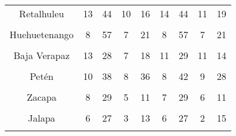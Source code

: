 {\begin{tabular}[t]{ccccccccc}
Retalhuleu & 13 & 44 & 10 & 16 & 14 & 44 & 11 & 19\\
\cellcolor[HTML]{B6B3FF}{San Marcos} & \cellcolor[HTML]{B6B3FF}{3} & \cellcolor[HTML]{B6B3FF}{51} & \cellcolor[HTML]{B6B3FF}{6} & \cellcolor[HTML]{B6B3FF}{18} & \cellcolor[HTML]{B6B3FF}{4} & \cellcolor[HTML]{B6B3FF}{49} & \cellcolor[HTML]{B6B3FF}{3} & \cellcolor[HTML]{B6B3FF}{16}\\
Huehuetenango & 8 & 57 & 7 & 21 & 8 & 57 & 7 & 21\\
\cellcolor[HTML]{B6B3FF}{Quiché} & \cellcolor[HTML]{B6B3FF}{7} & \cellcolor[HTML]{B6B3FF}{44} & \cellcolor[HTML]{B6B3FF}{8} & \cellcolor[HTML]{B6B3FF}{19} & \cellcolor[HTML]{B6B3FF}{6} & \cellcolor[HTML]{B6B3FF}{47} & \cellcolor[HTML]{B6B3FF}{5} & \cellcolor[HTML]{B6B3FF}{21}\\
Baja Verapaz & 13 & 28 & 7 & 18 & 11 & 29 & 11 & 14\\
\cellcolor[HTML]{B6B3FF}{Alta Verapaz} & \cellcolor[HTML]{B6B3FF}{8} & \cellcolor[HTML]{B6B3FF}{39} & \cellcolor[HTML]{B6B3FF}{6} & \cellcolor[HTML]{B6B3FF}{18} & \cellcolor[HTML]{B6B3FF}{8} & \cellcolor[HTML]{B6B3FF}{39} & \cellcolor[HTML]{B6B3FF}{6} & \cellcolor[HTML]{B6B3FF}{18}\\
Petén & 10 & 38 & 8 & 36 & 8 & 42 & 9 & 28\\
\cellcolor[HTML]{B6B3FF}{Izabal} & \cellcolor[HTML]{B6B3FF}{9} & \cellcolor[HTML]{B6B3FF}{24} & \cellcolor[HTML]{B6B3FF}{7} & \cellcolor[HTML]{B6B3FF}{15} & \cellcolor[HTML]{B6B3FF}{11} & \cellcolor[HTML]{B6B3FF}{20} & \cellcolor[HTML]{B6B3FF}{9} & \cellcolor[HTML]{B6B3FF}{13}\\
Zacapa & 8 & 29 & 5 & 11 & 7 & 29 & 6 & 11\\
\cellcolor[HTML]{B6B3FF}{Chiquimula} & \cellcolor[HTML]{B6B3FF}{6} & \cellcolor[HTML]{B6B3FF}{27} & \cellcolor[HTML]{B6B3FF}{10} & \cellcolor[HTML]{B6B3FF}{9} & \cellcolor[HTML]{B6B3FF}{9} & \cellcolor[HTML]{B6B3FF}{28} & \cellcolor[HTML]{B6B3FF}{4} & \cellcolor[HTML]{B6B3FF}{14}\\
Jalapa & 6 & 27 & 3 & 13 & 6 & 27 & 2 & 15\\
\cellcolor[HTML]{B6B3FF}{Jutiapa} & \cellcolor[HTML]{B6B3FF}{8} & \cellcolor[HTML]{B6B3FF}{31} & \cellcolor[HTML]{B6B3FF}{2} & \cellcolor[HTML]{B6B3FF}{10} & \cellcolor[HTML]{B6B3FF}{5} & \cellcolor[HTML]{B6B3FF}{34} & \cellcolor[HTML]{B6B3FF}{4} & \cellcolor[HTML]{B6B3FF}{15}\\
\bottomrule
\end{tabular}
}